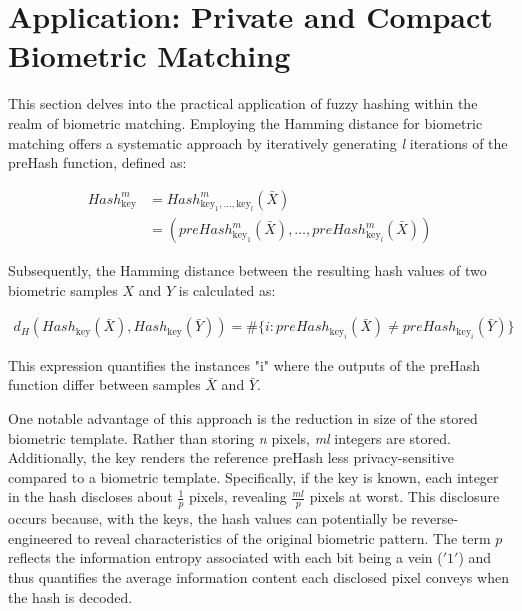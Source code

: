 \newpage
\section{Application: Private and Compact Biometric Matching}
\label{Application: Private and Compact Biometric Matching}

This section delves into the practical application of fuzzy hashing within the realm of biometric matching. Employing the Hamming distance for biometric matching offers a systematic approach by iteratively generating \textit{l} iterations of the preHash function, defined as:

\begin{equation}
    \begin{aligned}
        Hash_{\text{key}}^m &= Hash_{\text{key}_1, \ldots, \text{key}_l}^m(\bar{X})\\
        &= (preHash_{\text{key}_1}^m(\bar{X}), \ldots, preHash_{\text{key}_l}^m(\bar{X}))
    \end{aligned}
\end{equation}

Subsequently, the Hamming distance between the resulting hash values of two biometric samples \(X\) and \(Y\) is calculated as:

\begin{equation}
    \begin{aligned}
        \label{eq:HammingDist}
        d_H(Hash_{\text{key}}(\bar{X}), Hash_{\text{key}}(\bar{Y})) = \# \{i: preHash_{\text{key}_i}(\bar{X}) \neq preHash_{\text{key}_i}(\bar{Y})\}
    \end{aligned}
\end{equation}

This expression quantifies the instances "i" where the outputs of the preHash function differ between samples \(\bar{X}\) and \(\bar{Y}\).

One notable advantage of this approach is the reduction in size of the stored biometric template. Rather than storing \textit{n} pixels, \textit{ml} integers are stored. Additionally, the key renders the reference preHash less privacy-sensitive compared to a biometric template. Specifically, if the key is known, each integer in the hash discloses about \(\frac{1}{p}\) pixels, revealing \(\frac{ml}{p}\) pixels at worst. This disclosure occurs because, with the keys, the hash values can potentially be reverse-engineered to reveal characteristics of the original biometric pattern. The term \(p\)​ reflects the information entropy associated with each bit being a vein (\('1'\)) and thus quantifies the average information content each disclosed pixel conveys when the hash is decoded.

